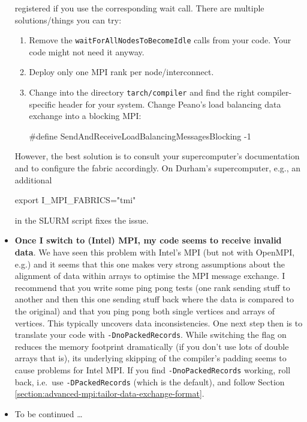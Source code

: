 \begin{itemize}
    registered if you use the corresponding wait call. There are multiple
    solutions/things you can try:
    \begin{enumerate}
      \item Remove the \texttt{waitForAllNodesToBecomeIdle} calls from your
      code. Your code might not need it anyway.
      \item Deploy only one MPI rank per node/interconnect.
      \item Change into the directory \texttt{tarch/compiler} and find the right
      compiler-specific header for your system. Change Peano's load balancing
      data exchange into a blocking MPI:
      \begin{code}
      #define SendAndReceiveLoadBalancingMessagesBlocking    -1
      \end{code}
    \end{enumerate}
    However, the best solution is to consult your supercomputer's documentation
    and to configure the fabric accordingly. On Durham's supercomputer, e.g., an
    additional
    \begin{code}
    export I_MPI_FABRICS="tmi"
    \end{code} 
    in the SLURM script fixes the issue.
  \item \textbf{ Once I switch to (Intel) MPI, my code seems to receive invalid
    data}. We have seen this problem with Intel's MPI (but not with OpenMPI, 
    e.g.) and it seems that this one makes very strong assumptions about the
    alignment of data within arrays to optimise the MPI message exchange. I
    recommend that you write some ping pong tests (one rank sending stuff to
    another and then this one sending stuff back where the data is compared to
    the original) and that you ping pong both single vertices and arrays of
    vertices. This typically uncovers data inconsistencies. One next step then
    is to translate your code with \texttt{-DnoPackedRecords}. While switching
    the flag on reduces the memory footprint dramatically (if you don't use
    lots of double arrays that is), its underlying skipping of the compiler's
    padding seems to cause problems for Intel MPI. If you find 
    \texttt{-DnoPackedRecords} working, roll back, i.e.~use 
    \texttt{-DPackedRecords} (which is the default), and follow Section
    \ref{section:advanced-mpi:tailor-data-exchange-format}.
  \item To be continued \ldots
\end{itemize}



